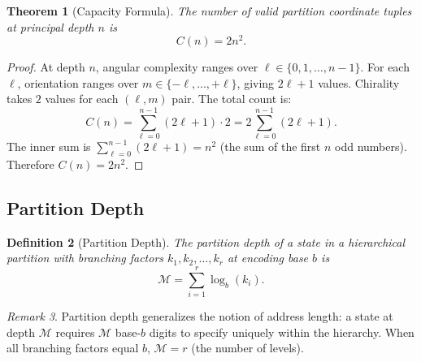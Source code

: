 \documentclass[twocolumn,10pt]{article}
\newtheorem{theorem}{Theorem}[section]
\newtheorem{definition}[theorem]{Definition}
\theoremstyle{remark}
\newtheorem{remark}[theorem]{Remark}
\newcommand{\Depth}{\mathcal{M}}
\begin{document}
\begin{theorem}[Capacity Formula]
\label{thm:capacity}
The number of valid partition coordinate tuples at principal depth $n$ is
\begin{equation}
C(n) = 2n^2.
\label{eq:capacity}
\end{equation}
\end{theorem}

\begin{proof}
At depth $n$, angular complexity ranges over $\ell \in \{0,1,\ldots,n-1\}$.
For each $\ell$, orientation ranges over $m \in \{-\ell,\ldots,+\ell\}$, giving $2\ell + 1$ values.
Chirality takes $2$ values for each $(\ell,m)$ pair.
The total count is:
\begin{equation}
C(n) = \sum_{\ell=0}^{n-1} (2\ell+1) \cdot 2 = 2\sum_{\ell=0}^{n-1}(2\ell+1).
\end{equation}
The inner sum is $\sum_{\ell=0}^{n-1}(2\ell+1) = n^2$ (the sum of the first $n$ odd numbers).
Therefore $C(n) = 2n^2$.
\end{proof}

\subsection{Partition Depth}

\begin{definition}[Partition Depth]
\label{def:partition_depth}
The \emph{partition depth} of a state in a hierarchical partition with branching factors $k_1, k_2, \ldots, k_r$ at encoding base $b$ is
\begin{equation}
\Depth = \sum_{i=1}^{r} \log_b(k_i).
\label{eq:partition_depth}
\end{equation}
\end{definition}

\begin{remark}
Partition depth generalizes the notion of address length: a state at depth $\Depth$ requires $\Depth$ base-$b$ digits to specify uniquely within the hierarchy.
When all branching factors equal $b$, $\Depth = r$ (the number of levels).
\end{remark}
\end{document}
